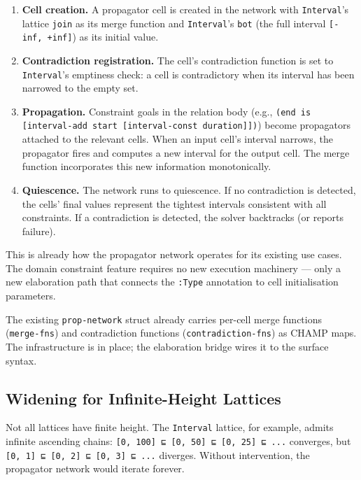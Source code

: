 \documentclass[11pt]{article}
\begin{document}
\begin{enumerate}
\item \textbf{Cell creation.} A propagator cell is created in the network with \texttt{Interval}'s
lattice \texttt{join} as its merge function and \texttt{Interval}'s \texttt{bot} (the full
interval \texttt{[-inf, +inf]}) as its initial value.

\item \textbf{Contradiction registration.} The cell's contradiction function is set to
\texttt{Interval}'s emptiness check: a cell is contradictory when its interval has
been narrowed to the empty set.

\item \textbf{Propagation.} Constraint goals in the relation body (e.g.,
\texttt{(end is [interval-add start [interval-const duration]])}) become
propagators attached to the relevant cells. When an input cell's interval
narrows, the propagator fires and computes a new interval for the output
cell. The merge function incorporates this new information monotonically.

\item \textbf{Quiescence.} The network runs to quiescence. If no contradiction is
detected, the cells' final values represent the tightest intervals consistent
with all constraints. If a contradiction is detected, the solver backtracks
(or reports failure).
\end{enumerate}

This is already how the propagator network operates for its existing use cases.
The domain constraint feature requires no new execution machinery --- only a new
elaboration path that connects the \texttt{:Type} annotation to cell initialisation
parameters.

The existing \texttt{prop-network} struct already carries per-cell merge functions
(\texttt{merge-fns}) and contradiction functions (\texttt{contradiction-fns}) as CHAMP maps.
The infrastructure is in place; the elaboration bridge wires it to the surface
syntax.
\subsection{Widening for Infinite-Height Lattices}
\label{sec:org885feb0}

Not all lattices have finite height. The \texttt{Interval} lattice, for example, admits
infinite ascending chains: \texttt{[0, 100] ⊑ [0, 50] ⊑ [0, 25] ⊑ ...} converges, but
\texttt{[0, 1] ⊑ [0, 2] ⊑ [0, 3] ⊑ ...} diverges. Without intervention, the
propagator network would iterate forever.
\end{document}
